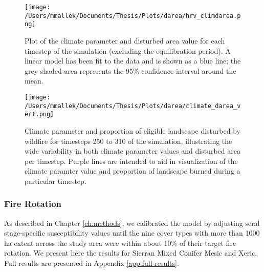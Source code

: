 \begin{figure}[!htbp]
  \centering
    \texttt{[image: /Users/mmallek/Documents/Thesis/Plots/darea/hrv\_climdarea.png]}
  \caption{Plot of the climate parameter and disturbed area value for each timestep of the simulation (excluding the equilibration period). A linear model has been fit to the data and is shown as a blue line; the grey shaded area represents the 95\% confidence interval around the mean.}
  \label{fig:climate_darea}
\end{figure}


\begin{figure}[!htbp]
\centering
\texttt{[image: /Users/mmallek/Documents/Thesis/Plots/darea/climate\_darea\_vert.png]}
\caption{Climate parameter and proportion of eligible landscape disturbed by wildfire for timesteps 250 to 310 of the simulation, illustrating the wide variability in both climate parameter values and disturbed area per timestep. Purple lines are intended to aid in visualization of the climate paramter value and proportion of landscape burned during a particular timestep.}
\label{fig:compare_clim_darea}
\end{figure}

\clearpage




\newpage
\subsubsection{Fire Rotation} 
As described in Chapter \ref{ch:methods}, we calibrated the model by adjusting seral stage-specific susceptibility values until the nine cover types with more than 1000 ha extent across the study area were within about 10\% of their target fire rotation. We present here the results for Sierran Mixed Conifer Mesic and Xeric. Full results are presented in Appendix \ref{app:full-results}. 

